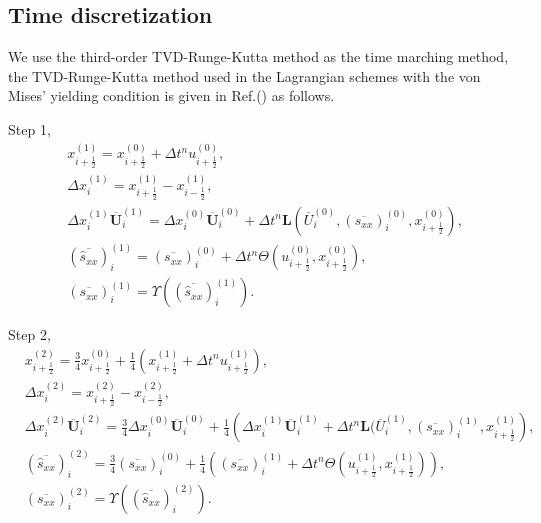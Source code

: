 \documentclass{article}
\numberwithin{equation}{section}
\numberwithin{table}{section}
\begin{document}
\subsection{Time discretization}
We use the third-order TVD-Runge-Kutta method  as the time marching method, the TVD-Runge-Kutta method used in the Lagrangian schemes with  the von Mises' yielding condition is given in Ref.(\cite{cheng2016harten}) as follows.

Step 1,
\begin{equation}
  \begin{aligned}
	& x_{i+\frac{1}{2}}^{(1)} = x_{i+\frac{1}{2}}^{(0)}+\Delta t^n u_{i+\frac{1}{2}}^{(0)},\\
	& \Delta x_i^{(1)} =  x_{i+\frac{1}{2}}^{(1)}- x_{i-\frac{1}{2}}^{(1)},\\
    & \Delta x_i^{(1)} \overline{\bm{U}}_i^{(1)}= \Delta x_i^{(0)} \overline{\bm{U}}_i^{(0)}+\Delta t^n \bm{L}(\overline{U}_i^{(0)}, (\overline{s_{xx}})_i^{(0)}, x_{i+\frac{1}{2}}^{(0)}),\\
	& (\overline{\hat{s}_{xx}})_i^{(1)} = (\overline{s_{xx}})_i^{(0)} +\Delta t^ n  \varTheta (u_{i+\frac{1}{2}}^{(0)}, x_{i+\frac{1}{2}}^{(0)}),\\
  & (\overline{s_{xx}})_i^{(1)} = \Upsilon((\overline{\hat{s}_{xx}})_i^{(1)}).
\end{aligned}
\end{equation}


Step 2,
\begin{equation}
  \begin{aligned}
	& x_{i+\frac{1}{2}}^{(2)} = \frac{3}{4} x_{i+\frac{1}{2}}^{(0)}+\frac{1}{4} \left( x_{i+\frac{1}{2}}^{(1)}+\Delta t^n u_{i+\frac{1}{2}}^{(1)}\right),\\
	& \Delta x_i^{(2)} =  x_{i+\frac{1}{2}}^{(2)}- x_{i-\frac{1}{2}}^{(2)},\\
	& \Delta x_i^{(2)} \overline{\bm{U}}_i^{(2)}  = \frac{3}{4} \Delta x_i^{(0)} \overline{\bm{U}}_i^{(0)}+ \frac{1}{4} \left(  \Delta x_i^{(1)} \overline{\bm{U}}_i^{(1)} + \Delta t^n \bm{L}(\overline{U}_i^{(1)}, (\overline{s_{xx}})_i^{(1)}, x_{i+\frac{1}{2}}^{(1)}\right),\\
	& (\overline{\hat{s}_{xx}})_i^{(2)} =\frac{3}{4} (\overline{s_{xx}})_i^{(0)} + \frac{1}{4} \left(  (\overline{s_{xx}})_i^{(1)}+\Delta t^ n \varTheta (u_{i+\frac{1}{2}}^{(1)}, x_{i+\frac{1}{2}}^{(1)})\right),\\
  & (\overline{s_{xx}})_i^{(2)} = \Upsilon((\overline{\hat{s}_{xx}})_i^{(2)}).
\end{aligned}
\end{equation}
\end{document}
